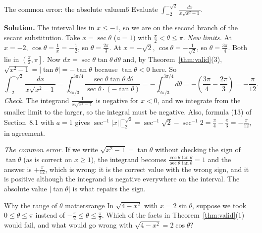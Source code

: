 \documentclass[11pt]{article}
\begin{document}
\begin{exmp}{The common error: the absolute value}{m6}
Evaluate $\displaystyle\int_{-2}^{-\sqrt2}\frac{dx}{x\sqrt{x^2-1}}$.

\textbf{Solution.} The interval lies in $x\le-1$, so we are on the second branch of the secant substitution. Take $x=\sec\theta$ ($a=1$) with $\frac\pi2<\theta\le\pi$. \emph{New limits.} At $x=-2$, $\cos\theta=\frac1x=-\frac12$, so $\theta=\frac{2\pi}3$. At $x=-\sqrt2$, $\cos\theta=-\frac1{\sqrt2}$, so $\theta=\frac{3\pi}4$. Both lie in $\left(\frac\pi2,\pi\right]$. Now $dx=\sec\theta\tan\theta\,d\theta$ and, by Theorem~\ref{thm:valid}(3), $\sqrt{x^2-1}=\lvert\tan\theta\rvert=-\tan\theta$ because $\tan\theta<0$ here. So
\[\int_{-2}^{-\sqrt2}\frac{dx}{x\sqrt{x^2-1}}=\int_{2\pi/3}^{3\pi/4}\frac{\sec\theta\tan\theta\,d\theta}{\sec\theta\cdot(-\tan\theta)}=-\int_{2\pi/3}^{3\pi/4}d\theta=-\left(\frac{3\pi}4-\frac{2\pi}3\right)=-\frac\pi{12} .\]
\emph{Check.} The integrand $\frac1{x\sqrt{x^2-1}}$ is negative for $x<0$, and we integrate from the smaller limit to the larger, so the integral must be negative. Also, formula (13) of Section~8.1 with $a=1$ gives $\sec^{-1}\lvert x\rvert\Big|_{-2}^{-\sqrt2}=\sec^{-1}\sqrt2-\sec^{-1}2=\frac\pi4-\frac\pi3=-\frac\pi{12}$, in agreement.

\emph{The common error.} If we write $\sqrt{x^2-1}=\tan\theta$ without checking the sign of $\tan\theta$ (as is correct on $x\ge1$), the integrand becomes $\frac{\sec\theta\tan\theta}{\sec\theta\tan\theta}=1$ and the answer is $+\frac\pi{12}$, which is wrong: it is the correct value with the wrong sign, and it is positive although the integrand is negative everywhere on the interval. The absolute value $\lvert\tan\theta\rvert$ is what repairs the sign.
\end{exmp}

\begin{think}{Why the range of $\theta$ matters}{range}
In $\sqrt{4-x^2}$ with $x=2\sin\theta$, suppose we took $0\le\theta\le\pi$ instead of $-\frac\pi2\le\theta\le\frac\pi2$. Which of the facts in Theorem~\ref{thm:valid}(1) would fail, and what would go wrong with $\sqrt{4-x^2}=2\cos\theta$?
\end{think}
\end{document}
